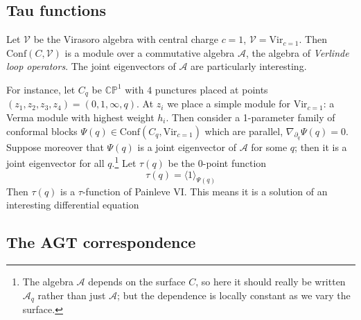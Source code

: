 \documentclass[12pt,letterpaper,reqno]{amsart}
\numberwithin{equation}{section}
\newcommand{\cA}{\ensuremath{\mathcal A}}
\newcommand{\Vir}{{\mathrm{Vir}}}
\newcommand{\bbC}{\ensuremath{\mathbb C}}
\newcommand{\bbP}{\ensuremath{\mathbb P}}
\newcommand{\vertex}{\mathcal{V}}
\newcommand{\IP}[1]{\langle#1\rangle}
\newcommand{\Conf}{\textrm{Conf}}
\newcommand{\ti}[1]{\textit{#1}}
\DeclareRobustCommand{\fixme}[1]{\leavevmode{\color{orange}[#1]}}
\begin{document}
\subsection{Tau functions}

Let $\vertex$ be the Virasoro algebra with central charge $c=1$, $\vertex = \Vir_{c=1}$.
Then $\Conf(C, \vertex)$ is a module over a commutative algebra $\cA$, the algebra of
\ti{Verlinde loop operators}.
The joint eigenvectors of $\cA$ are particularly interesting.

For instance, let $C_q$ be $\bbC\bbP^1$ with $4$ punctures
placed at points $(z_1, z_2, z_3, z_4) = (0,1,\infty,q)$. At $z_i$ we place a simple module for $\Vir_{c=1}$:
a Verma module with highest weight $h_i$.
Then consider a 1-parameter family of conformal blocks $\Psi(q) \in \Conf(C_q, \Vir_{c=1})$
which are parallel, $\nabla_{\partial_q} \Psi(q) = 0$. 
Suppose moreover that $\Psi(q)$ is a joint eigenvector of $\cA$ for some $q$;
then it is a joint eigenvector for all $q$.\footnote{The algebra $\cA$ depends on the surface $C$, so here it should
really be written $\cA_q$ rather than just $\cA$; but the dependence is locally constant as we vary the surface.}
Let $\tau(q)$ be the $0$-point function
\begin{equation}
\tau(q) = \IP{1}_{\Psi(q)}
\end{equation}
Then $\tau(q)$ is a $\tau$-function of Painleve VI.
This means it is a solution of an interesting differential equation \fixme{...}




\subsection{The AGT correspondence} \fixme{...}
\end{document}
